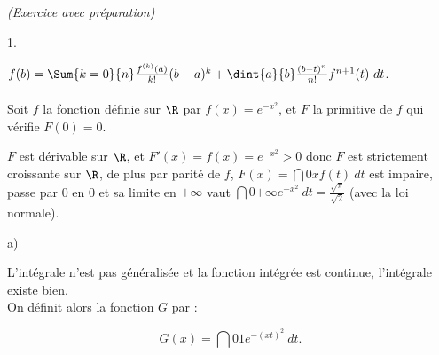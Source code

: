 \documentclass[11pt]{article}%
\begin{document}
 \begin{exercice}{\it (Exercice avec préparation)}~
 \begin{noliste}{1.}
 \setlength{\itemsep}{4mm}
 \item $f(b) = \Sum{k = 0}{n} \frac{f^{(k)} (a)}{k!} (b-a)^{k} +
\dint{a}{b} \frac{(b-t)^{n}}{n!} f^{n + 1} (t)\ dt$. \\
\\
 Soit $f$ la fonction définie sur $\R$ par $f(x) = e^{-x^{2}}$, et $F$
la primitive de $f$ qui vérifie $F(0) = 0$. \\
 \item $F$ est dérivable sur $\R$, et $F'(x) = f(x) = e^{ - x^{2}} > 0$
donc $F$ est strictement croissante sur $\R$, de plus par parité de
$f$, $F(x) = \dint{0}{x} f(t)\ dt$ est impaire, passe par 0 en 0 et sa
limite en $ + \infty$ vaut $\dint{0}{+ \infty} e^{-x^{2}}\ dt =
\frac{\sqrt{\pi}}{\sqrt{2} }$ (avec la loi normale). \\
 \item \begin{noliste}{a)}
 \setlength{\itemsep}{2mm}
 \item L'intégrale n'est pas généralisée et la fonction intégrée est
continue, l'intégrale existe bien. \\
 On définit alors la fonction $G$ par :
 
\[
 G(x) = \dint{0}{1} e^{-(xt)^{2}}\ dt. 
 
\]
\end{noliste}
\end{noliste}
\end{exercice}
\end{document}
